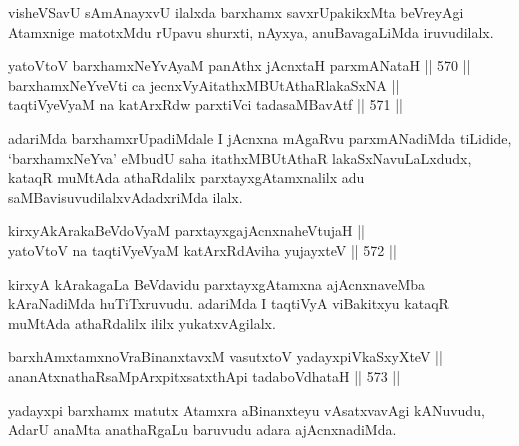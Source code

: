 \begin{artha}
visheVSavU sAmAnayxvU ilalxda barxhamx savxrUpakikxMta beVreyAgi
Atamxnige matotxMdu rUpavu shurxti, nAyxya, anuBavagaLiMda
iruvudilalx.
\end{artha}

\begin{shl}
yatoV\s toV barxhamxNeYvAyaM panAthx jAcnxtaH parxmANataH \hfill || 570 ||  \\
barxhamxNeYveVti ca jecnxVyA\footnotemark[1] \footnotemark[2]itathxMBUtAthaRlakaSxNA || \\
taqtiVyeVyaM na katArxRdw parxtiVci tadasaMBavAtf \hfill || 571 ||  
\end{shl}

\begin{artha}
adariMda barxhamxrUpadiMdale I jAcnxna mAgaRvu parxmANadiMda
tiLidide, `barxhamxNeYva' eMbudU saha itathxMBUtAthaR
lakaSxNavuLaLxdudx, kataqR muMtAda athaRdalilx parxtayxgAtamxnalilx
adu saMBavisuvudilalxvAdadxriMda ilalx.
\end{artha}


\begin{shl}
kirxyAkArakaBeVdoV\s yaM parxtayxgajAcnxnaheVtujaH || \\
yatoV\s toV na taqtiVyeVyaM katArxRdAviha yujayxteV \hfill || 572 ||  
\end{shl}

\begin{artha}
kirxyA kArakagaLa BeVdavidu parxtayxgAtamxna ajAcnxnaveMba kAraNadiMda
huTiTxruvudu. adariMda I taqtiVyA viBakitxyu kataqR muMtAda athaRdalilx
ililx yukatxvAgilalx.
\end{artha}

\begin{shl}
barxhAmxtamxnoVraBinanxtavxM vasutxtoV yadayxpiVkaSxyXteV || \\
ananAtxnathaRsaMpArxpitxsatxthA\s pi tadaboVdhataH \hfill || 573 ||   
\end{shl}

\begin{artha}
yadayxpi barxhamx matutx Atamxra aBinanxteyu vAsatxvavAgi kANuvudu,
AdarU anaMta anathaRgaLu baruvudu adara ajAcnxnadiMda.
\end{artha}

